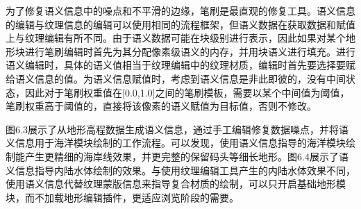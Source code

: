 为了修复语义信息中的噪点和不平滑的边缘，笔刷是最直观的修复工具。语义信息的编辑与纹理信息的编辑可以使用相同的流程框架，但语义数据在获取数据和赋值上与纹理编辑有所不同。由于语义数据可能在块级别进行表示，因此如果对某个地形块进行笔刷编辑时首先为其分配像素级语义的内存，并用块语义进行填充。进行语义编辑时，具体的语义值相当于纹理编辑中的纹理材质，编辑时首先要选择要赋给语义信息的值。为语义信息赋值时，考虑到语义信息是非此即彼的，没有中间状态，因此对于笔刷权重值在[0.0,1.0]之间的笔刷模板，需要以某个中间值为阈值，笔刷权重高于阈值的，直接将该像素的语义赋值为目标值，否则不修改。\par
图6.3展示了从地形高程数据生成语义信息，通过手工编辑修复数据噪点，并将语义信息用于海洋模块绘制的工作流程。可以发现，使用语义信息指导的海洋模块绘制能产生更精细的海岸线效果，并更完整的保留码头等细长地形。图6.4展示了语义信息指导内陆水体绘制的效果。与使用纹理编辑工具产生的内陆水体效果不同，使用语义信息代替纹理蒙版信息来指导复合材质的绘制，可以只开启基础地形模块，而不加载地形编辑插件，更适应浏览阶段的需要。\par
\newpage
